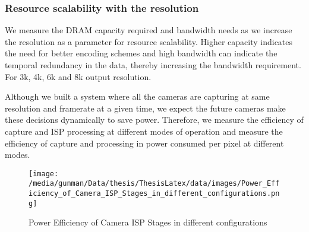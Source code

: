 \subsubsection{Resource scalability with the resolution}
We measure the DRAM capacity required and bandwidth needs as we increase the resolution as a parameter for resource scalability. Higher capacity indicates the need for better encoding schemes and high bandwidth can indicate the temporal redundancy in the data, thereby increasing the bandwidth requirement. For 3k, 4k, 6k and 8k output resolution.

Although we built a system where all the cameras are capturing at same resolution and framerate at a given time, we expect the future cameras make these decisions dynamically to save power. Therefore, we  measure the efficiency of capture and ISP processing at different modes of operation and measure the efficiency of capture and processing in power consumed per pixel at different modes.

%

\begin{figure*}
	\begin{center}
		\texttt{[image: /media/gunman/Data/thesis/ThesisLatex/data/images/Power\_Efficiency\_of\_Camera\_ISP\_Stages\_in\_different\_configurations.png]}
		\caption{Power Efficiency of Camera ISP Stages in different configurations}
		\label{fig:ex_4_9}
	\end{center}
	\vspace{-0.3in}
\end{figure*} 

